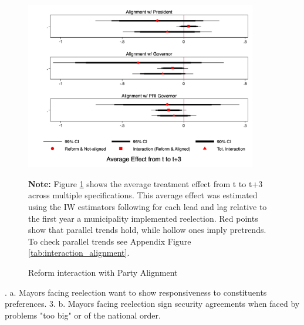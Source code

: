 \documentclass[12pt]{amsart}
\numberwithin{equation}{section}
\theoremstyle{definition}
\theoremstyle{definition}
\theoremstyle{definition}
\begin{document}
\begin{figure}[H]   
\centering
 \caption{Reform interaction with Party Alignment}
 \label{fig:alignment}
\includegraphics[width=0.9\textwidth]{../Figures/interaction_alignment_full.png}
       \captionsetup{justification=centering}
       
 \textbf{Note:} Figure \ref{fig:alignment} shows the average treatment effect from t to t+3 across multiple specifications. This average effect was estimated using the IW estimators following \citet{abraham_sun_2020} for each lead and lag relative to the first year a municipality implemented reelection. Red points show that parallel trends hold, while hollow ones imply pretrends. To check parallel trends see Appendix Figure \ref{tab:interaction_alignment}.  
\end{figure}  

. a. Mayors facing reelection want to show responsiveness to constituents preferences. 
3. b. Mayors facing reelection sign security agreements when faced by problems "too big" or of the national order. 
\end{document}

